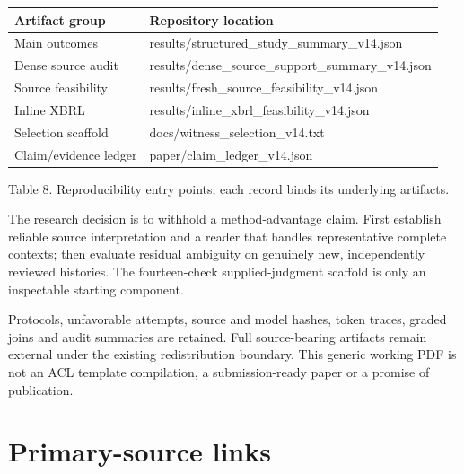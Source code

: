\documentclass[11pt]{article}
\begin{document}
{\small

\begin{longtable}{>{\raggedright\arraybackslash}p{}>{\raggedright\arraybackslash}p{}}

\toprule

\textbf{Artifact group} & \textbf{Repository location} \\

\midrule\endhead

Main outcomes & results/structured\_study\_summary\_v14.json \\

Dense source audit & results/dense\_source\_support\_summary\_v14.json \\

Source feasibility & results/fresh\_source\_feasibility\_v14.json \\

Inline XBRL & results/inline\_xbrl\_feasibility\_v14.json \\

Selection scaffold & docs/witness\_selection\_v14.txt \\

Claim/evidence ledger & paper/claim\_ledger\_v14.json \\

\bottomrule

\end{longtable}

}

{\small Table 8. Reproducibility entry points; each record binds its underlying artifacts.}

The research decision is to withhold a method-advantage claim. First establish reliable source interpretation and a reader that handles representative complete contexts; then evaluate residual ambiguity on genuinely new, independently reviewed histories. The fourteen-check supplied-judgment scaffold is only an inspectable starting component.


Protocols, unfavorable attempts, source and model hashes, token traces, graded joins and audit summaries are retained. Full source-bearing artifacts remain external under the existing redistribution boundary. This generic working PDF is not an ACL template compilation, a submission-ready paper or a promise of publication.


\section*{Primary-source links}
\end{document}
